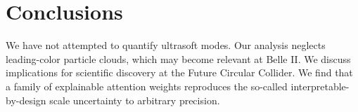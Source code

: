 \section{Conclusions}\label{sec:conclusions}

We have not attempted to quantify ultrasoft modes. Our analysis neglects
leading-color particle clouds, which may become relevant at Belle II. We
discuss implications for scientific discovery at the Future Circular
Collider. We find that a family of explainable attention weights
reproduces the so-called interpretable-by-design scale uncertainty to
arbitrary precision.

